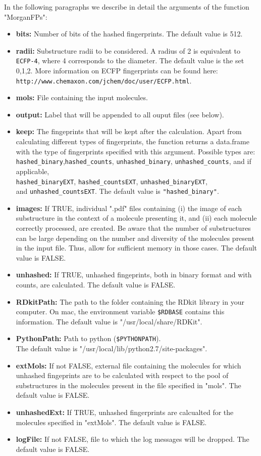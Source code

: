 \documentclass[twoside,a4wide,12pt]{article}\usepackage[]{graphicx}\usepackage[]{color}
\begin{document}
In the following paragraphs we describe in detail the arguments of the function "MorganFPs":
\begin{itemize}
\item {\bf bits:} Number of bits of the hashed fingerprints. The default value is 512.
\item {\bf radii:} Substructure radii to be considered. A radius of 2 is equivalent to \verb|ECFP-4|, where 4 corresponds to the diameter. The default value is the set {0,1,2}.
More information on ECFP fingerprints can be found here:\\
\verb|http://www.chemaxon.com/jchem/doc/user/ECFP.html|.
\item {\bf mols:} File containing the input molecules.
\item {\bf output:} Label that will be appended to all ouput files (see below).
\item {\bf keep:} The fingeprints that will be kept after the calculation.
Apart from calculating different types of fingerprints, the function returns a data.frame with the type of fingerprints specified with this argument.  Possible types are: \verb|hashed_binary|,\verb|hashed_counts|, \verb|unhashed_binary|, \verb|unhashed_counts|, and if applicable,\\
\verb|hashed_binaryEXT|, \verb|hashed_countsEXT|, \verb|unhashed_binaryEXT|,\\
and \verb|unhashed_countsEXT|.
The default value is \verb|"hashed_binary"|.
\item {\bf images:} If TRUE, individual ".pdf" files containing (i) the image of each substructure in the context of a molecule presenting it, and (ii) each molecule correctly processed, are created.  Be aware that the number of substructures can be large depending on the number and diversity of the molecules present in the input file. Thus, allow for sufficient memory in those cases.
The default value is FALSE.
\item {\bf unhashed:} If TRUE, unhashed fingeprints, both in binary format and with counts, are calculated. The default value is FALSE.
\item {\bf RDkitPath:} The path to the folder containing the RDkit library in your computer. On mac, the environment variable \verb|$RDBASE| contains this information. The default value is "/usr/local/share/RDKit".
\item {\bf PythonPath:} Path to python (\verb|$PYTHONPATH|).\\
The default value is "/usr/local/lib/python2.7/site-packages".
\item {\bf extMols:} If not FALSE, external file containing the molecules for which unhashed fingeprints are to be calculated with respect to the pool of
substructures in the molecules present in the file specified in "mols". The default value is FALSE.
\item {\bf unhashedExt:} If TRUE, unhashed fingerprints are calcualted for the molecules specified in "extMols". The default value is FALSE.
\item {\bf logFile:} If not FALSE, file to which the log messages will be dropped. The default value is FALSE.
\end{itemize}
\end{document}
